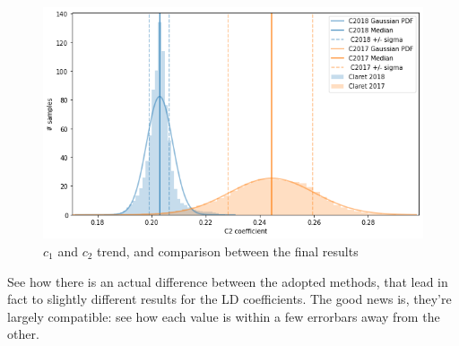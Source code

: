 \documentclass[a4paper,11pt,twocolumn]{article}
\begin{document}
\begin{figure}[H]
    \includegraphics[scale=0.35, angle=0]{../pictures/ClaretvClaret/c2_comp.png}
    \caption{$c_1$ and $c_2$ trend, and comparison between the final results}
\end{figure}
See how there is an actual difference between the adopted methods, that lead 
in fact to slightly different results for the LD coefficients. The good news is, 
they're largely compatible: see how each value is within a few errorbars away 
from the other.
\end{document}
